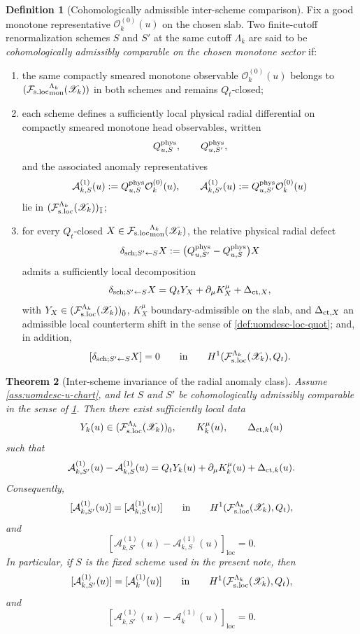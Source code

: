 \documentclass[11pt]{article}
\theoremstyle{definition}
\newtheorem{definition}{Definition}[section]
\theoremstyle{plain}
\newtheorem{theorem}[definition]{Theorem}
\theoremstyle{remark}
\newcommand{\Fsloc}{\mathcal F_{\rm s.loc}}
\newcommand{\Xscr}{\mathscr X}
\newcommand{\Ozero}{\mathcal O^{(0)}}
\newcommand{\Aone}{\mathcal A^{(1)}}
\newcommand{\Qt}{Q_t}
\newcommand{\loc}{\mathrm{loc}}
\begin{document}
\begin{definition}[Cohomologically admissible inter-scheme comparison]
\label{def:uomdesc-interscheme}
Fix a good monotone representative \(\Ozero_k(u)\) on the chosen slab.
Two finite-cutoff renormalization schemes \(S\) and \(S'\) at the same cutoff \(\Lambda_k\) are
said to be \emph{cohomologically admissibly comparable on the chosen monotone sector} if:
\begin{enumerate}[leftmargin=2em]
\item the same compactly smeared monotone observable \(\Ozero_k(u)\) belongs to
  \(({\Fsloc}_{\rm mon}^{\Lambda_k}(\Xscr_k))\) in both schemes and remains \(\Qt\)-closed;
\item each scheme defines a sufficiently local physical radial differential on compactly smeared
  monotone head observables, written
  \[
  Q_{u,S}^{\rm phys},
  \qquad
  Q_{u,S'}^{\rm phys},
  \]
  and the associated anomaly representatives
  \[
  \mathcal A_{k,S}^{(1)}(u):=Q_{u,S}^{\rm phys}\Ozero_k(u),
  \qquad
  \mathcal A_{k,S'}^{(1)}(u):=Q_{u,S'}^{\rm phys}\Ozero_k(u)
  \]
  lie in \((\Fsloc^{\Lambda_k}(\Xscr_k))_{\bar 1}\);
\item for every \(\Qt\)-closed
  \(X\in{\Fsloc}_{\rm mon}^{\Lambda_k}(\Xscr_k)\), the relative physical radial defect
  \[
  \delta_{{\rm sch};S'\leftarrow S}X
  :=
  \big(Q_{u,S'}^{\rm phys}-Q_{u,S}^{\rm phys}\big)X
  \]
  admits a sufficiently local decomposition
  \[
  \delta_{{\rm sch};S'\leftarrow S}X
  =
  \Qt Y_X+\partial_\mu K_X^\mu+\Delta_{{\rm ct},X},
  \]
  with \(Y_X\in(\Fsloc^{\Lambda_k}(\Xscr_k))_{\bar 0}\), \(K_X^\mu\) boundary-admissible on the
  slab, and \(\Delta_{{\rm ct},X}\) an admissible local counterterm shift in the sense of
  \cref{def:uomdesc-loc-quot};
  and, in addition,
  \[
  [\delta_{{\rm sch};S'\leftarrow S}X]
  =
  0
  \qquad\text{in}\qquad
  H^1(\Fsloc^{\Lambda_k}(\Xscr_k),\Qt).
  \]
\end{enumerate}
\end{definition}

\begin{theorem}[Inter-scheme invariance of the radial anomaly class]
\label{thm:uomdesc-interscheme}
Assume \cref{ass:uomdesc-u-chart}, and let \(S\) and \(S'\) be cohomologically admissibly
comparable in the sense of \cref{def:uomdesc-interscheme}.
Then there exist sufficiently local data
\[
Y_k(u)\in(\Fsloc^{\Lambda_k}(\Xscr_k))_{\bar 0},
\qquad
K_k^\mu(u),
\qquad
\Delta_{{\rm ct},k}(u)
\]
such that
\begin{equation}
\mathcal A_{k,S'}^{(1)}(u)-\mathcal A_{k,S}^{(1)}(u)
=
\Qt Y_k(u)+\partial_\mu K_k^\mu(u)+\Delta_{{\rm ct},k}(u).
\label{eq:uomdesc-interscheme-diff}
\end{equation}
Consequently,
\[
[\mathcal A_{k,S'}^{(1)}(u)]
=
[\mathcal A_{k,S}^{(1)}(u)]
\qquad\text{in}\qquad
H^1(\Fsloc^{\Lambda_k}(\Xscr_k),\Qt),
\]
and
\[
[\mathcal A_{k,S'}^{(1)}(u)-\mathcal A_{k,S}^{(1)}(u)]_{\loc}=0.
\]
In particular, if \(S\) is the fixed scheme used in the present note, then
\[
[\mathcal A_{k,S'}^{(1)}(u)]
=
[\Aone_k(u)]
\qquad\text{in}\qquad
H^1(\Fsloc^{\Lambda_k}(\Xscr_k),\Qt),
\]
and
\[
[\mathcal A_{k,S'}^{(1)}(u)-\Aone_k(u)]_{\loc}=0.
\]
\end{theorem}
\end{document}

